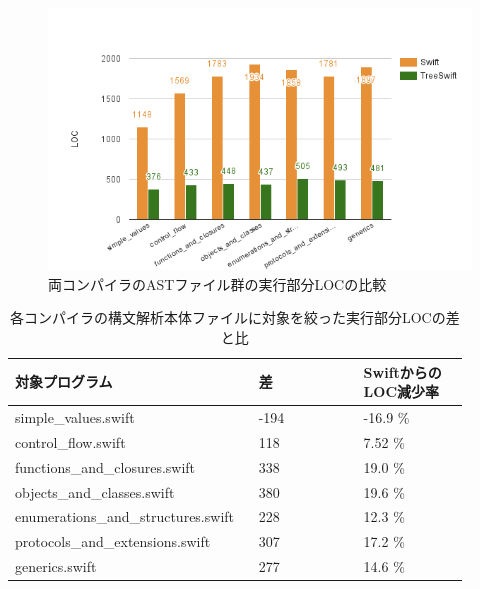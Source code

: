 \begin{figure}
    \begin{center}
        \includegraphics[scale=0.8]{./img/ast_loc_result.png}
        \caption{両コンパイラのASTファイル群の実行部分LOCの比較}
        \label{img:ast-loc-result}
    \end{center}
\end{figure}

\begin{table}[!hbtp]
    \begin{center}
        \caption{各コンパイラの構文解析本体ファイルに対象を絞った実行部分LOCの差と比}
        \begin{tabular}{|p{0.45\linewidth}|p{0.225\linewidth}|p{0.225\linewidth}|}
            \hline
            対象プログラム & 差 & SwiftからのLOC減少率\\
            \hline
            \hline
            simple\_values.swift & -194 & -16.9 \%\\
            \hline
            control\_flow.swift & 118 & 7.52 \%\\
            \hline
            functions\_and\_closures.swift & 338 & 19.0 \%\\
            \hline
            objects\_and\_classes.swift & 380 & 19.6 \%\\
            \hline
            enumerations\_and\_structures.swift & 228 & 12.3 \%\\
            \hline
            protocols\_and\_extensions.swift & 307 & 17.2 \%\\
            \hline
            generics.swift & 277 & 14.6 \%\\
            \hline
        \end{tabular}
        \label{table:parse-loc-arith}
    \end{center}
\end{table}

